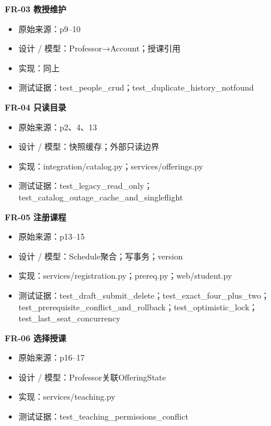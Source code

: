 \documentclass[UTF8,11pt,a4paper]{ctexart}
\providecommand{\tightlist}{\setlength{\itemsep}{0pt}\setlength{\parskip}{0pt}}
\begin{document}
\textbf{FR-03 教授维护}

\begin{itemize}
\tightlist
\item
  原始来源：p9--10
\item
  设计 / 模型：Professor→Account；授课引用
\item
  实现：同上
\item
  测试证据：test\_\allowbreak{}people\_\allowbreak{}crud；test\_\allowbreak{}duplicate\_\allowbreak{}history\_\allowbreak{}notfound
\end{itemize}

\textbf{FR-04 只读目录}

\begin{itemize}
\tightlist
\item
  原始来源：p2、4、13
\item
  设计 / 模型：快照缓存；外部只读边界
\item
  实现：integration/catalog.py；services/offerings.py
\item
  测试证据：test\_\allowbreak{}legacy\_\allowbreak{}read\_\allowbreak{}only；test\_\allowbreak{}catalog\_\allowbreak{}outage\_\allowbreak{}cache\_\allowbreak{}and\_\allowbreak{}singleflight
\end{itemize}

\textbf{FR-05 注册课程}

\begin{itemize}
\tightlist
\item
  原始来源：p13--15
\item
  设计 / 模型：Schedule聚合；写事务；version
\item
  实现：services/registration.py；prereq.py；web/student.py
\item
  测试证据：test\_\allowbreak{}draft\_\allowbreak{}submit\_\allowbreak{}delete；test\_\allowbreak{}exact\_\allowbreak{}four\_\allowbreak{}plus\_\allowbreak{}two；test\_\allowbreak{}prerequisite\_\allowbreak{}conflict\_\allowbreak{}and\_\allowbreak{}rollback；test\_\allowbreak{}optimistic\_\allowbreak{}lock；test\_\allowbreak{}last\_\allowbreak{}seat\_\allowbreak{}concurrency
\end{itemize}

\textbf{FR-06 选择授课}

\begin{itemize}
\tightlist
\item
  原始来源：p16--17
\item
  设计 / 模型：Professor关联OfferingState
\item
  实现：services/teaching.py
\item
  测试证据：test\_\allowbreak{}teaching\_\allowbreak{}permissions\_\allowbreak{}conflict
\end{itemize}
\end{document}

